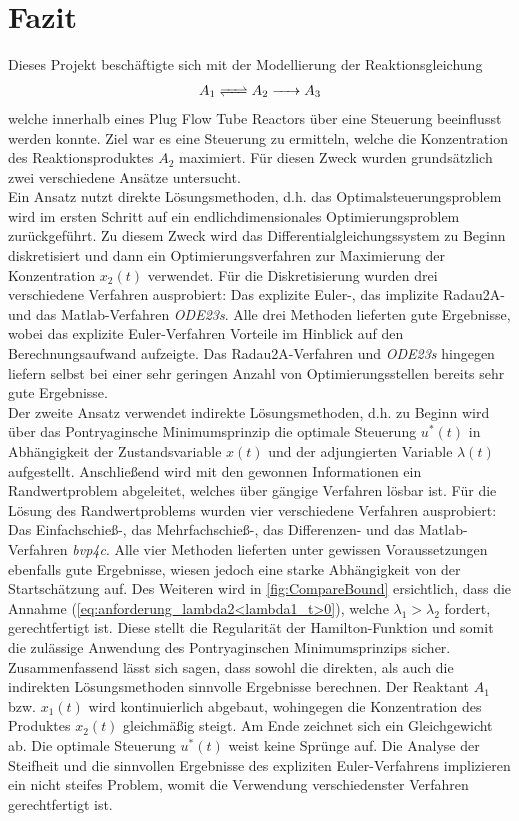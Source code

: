 \chapter{Fazit}
Dieses Projekt beschäftigte sich mit der Modellierung der Reaktionsgleichung 
\begin{align}
	A_1 \ce{<=>} A_2  \ce{->} A_3
\end{align}
welche innerhalb eines Plug Flow Tube Reactors über eine Steuerung beeinflusst werden konnte. Ziel war es eine Steuerung zu ermitteln, welche die Konzentration des Reaktionsproduktes $A_2$ maximiert. Für diesen Zweck wurden grundsätzlich zwei verschiedene Ansätze untersucht. 
\\Ein Ansatz nutzt direkte Lösungsmethoden, d.h. das Optimalsteuerungsproblem wird im ersten Schritt auf ein endlichdimensionales Optimierungsproblem zurückgeführt. Zu diesem Zweck wird das Differentialgleichungssystem zu Beginn diskretisiert und dann ein Optimierungsverfahren zur Maximierung der Konzentration $x_2(t)$ verwendet. Für die Diskretisierung wurden drei verschiedene Verfahren ausprobiert: Das explizite Euler-, das implizite Radau2A- und das Matlab-Verfahren \textit{ODE23s}. Alle drei Methoden lieferten gute Ergebnisse, wobei das explizite Euler-Verfahren Vorteile im Hinblick auf den Berechnungsaufwand aufzeigte. Das Radau2A-Verfahren und \textit{ODE23s} hingegen liefern selbst bei einer sehr geringen Anzahl von Optimierungsstellen bereits sehr gute Ergebnisse.
\\Der zweite Ansatz verwendet indirekte Lösungsmethoden, d.h. zu Beginn wird über das Pontryaginsche Minimumsprinzip die optimale Steuerung $u^*(t)$ in Abhängigkeit der Zustandsvariable $x(t)$ und der adjungierten Variable $\lambda(t)$ aufgestellt. Anschließend wird mit den gewonnen Informationen ein Randwertproblem abgeleitet, welches über gängige Verfahren lösbar ist. Für die Lösung des Randwertproblems wurden vier verschiedene Verfahren ausprobiert: Das Einfachschieß-, das Mehrfachschieß-, das Differenzen- und das Matlab-Verfahren \textit{bvp4c}. Alle vier Methoden lieferten unter gewissen Voraussetzungen ebenfalls gute Ergebnisse, wiesen jedoch eine starke Abhängigkeit von der Startschätzung auf. Des Weiteren wird in \autoref{fig:CompareBound} ersichtlich, dass die Annahme (\ref{eq:anforderung_lambda2<lambda1_t>0}), welche $\lambda_1 > \lambda_2$  fordert, gerechtfertigt ist. Diese stellt die Regularität der Hamilton-Funktion und somit die zulässige Anwendung des Pontryaginschen Minimumsprinzips sicher.
\\Zusammenfassend lässt sich sagen, dass sowohl die direkten, als auch die indirekten Lösungsmethoden sinnvolle Ergebnisse berechnen. Der Reaktant $A_1$ bzw. $x_1(t)$ wird kontinuierlich abgebaut, wohingegen die Konzentration des Produktes $x_2(t)$ gleichmäßig steigt. Am Ende zeichnet sich ein Gleichgewicht ab. Die optimale Steuerung $u^*(t)$ weist keine Sprünge auf. Die Analyse der Steifheit und die sinnvollen Ergebnisse des expliziten Euler-Verfahrens implizieren ein nicht steifes Problem, womit die Verwendung verschiedenster Verfahren gerechtfertigt ist.
